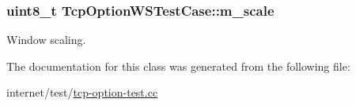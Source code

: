 \subsubsection[{\texorpdfstring{m\+\_\+scale}{m_scale}}]{\setlength{\rightskip}{0pt plus 5cm}uint8\+\_\+t Tcp\+Option\+W\+S\+Test\+Case\+::m\+\_\+scale\hspace{0.3cm}{\ttfamily [private]}}\hypertarget{classTcpOptionWSTestCase_a4847a798c3330400decfb801a8ef1c77}{}\label{classTcpOptionWSTestCase_a4847a798c3330400decfb801a8ef1c77}


Window scaling. 



The documentation for this class was generated from the following file\+:\begin{DoxyCompactItemize}
\item 
internet/test/\hyperlink{tcp-option-test_8cc}{tcp-\/option-\/test.\+cc}\end{DoxyCompactItemize}
